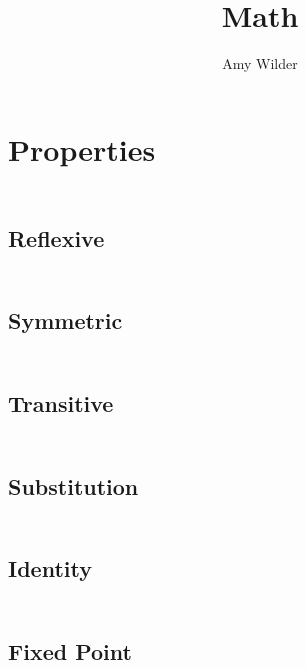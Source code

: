 \documentclass{report}
\title{Math}
\author{Amy Wilder}
\begin{document}
    \maketitle
    
    \chapter{Properties}
    \begin{gather*}
    \end{gather*}

    \section{Reflexive}
    \begin{gather*}
    \end{gather*}

    \section{Symmetric}
    \begin{gather*}
    \end{gather*}

    \section{Transitive}
    \begin{gather*}
    \end{gather*}

    \section{Substitution}
    \begin{gather*}
    \end{gather*}

    \section{Identity}
    \begin{gather*}
    \end{gather*}

    \section{Fixed Point}
    \begin{gather*}
    \end{gather*}
\end{document}
